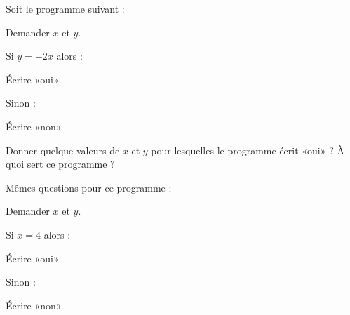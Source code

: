 
Soit le programme suivant :

\begin{fmpage}{0.9\linewidth}

    Demander \( x\) et \( y\).

    Si \( y=-2x\) alors :

    \hspace{1cm} Écrire «oui» 

    Sinon :

    \hspace{1cm} Écrire «non» 

\end{fmpage}

Donner quelque valeurs de \( x\) et \( y\) pour lesquelles le programme écrit «oui» ? À quoi sert ce programme ?

Mêmes questions pour ce programme :

\begin{fmpage}{0.9\linewidth}

    Demander \( x\) et \( y\).

    Si \( x=4\) alors :

    \hspace{1cm} Écrire «oui» 

    Sinon :

    \hspace{1cm} Écrire «non» 

\end{fmpage}
